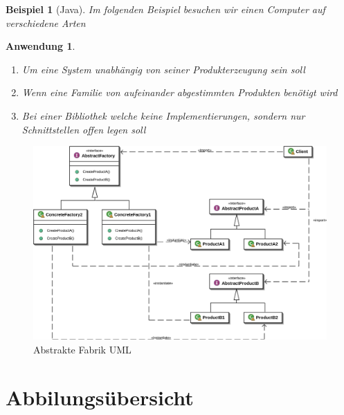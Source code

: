 \documentclass[a4paper]{article}
\theoremstyle{break}
\newtheorem{ex}{Beispiel}[section]
\newtheorem{why}{Anwendung}[section]
\begin{document}
\begin{ex}[Java]
	Im folgenden Beispiel besuchen wir einen Computer auf verschiedene Arten
	
	
	
	
	
	
	
	
	
	
	
	
\end{ex}

\begin{why}
	\begin{enumerate}
		\item Um eine System unabhängig von seiner Produkterzeugung sein soll
		\item Wenn eine Familie von aufeinander abgestimmten Produkten benötigt wird
		\item Bei einer Bibliothek welche keine Implementierungen, sondern nur Schnittstellen offen legen soll
	\end{enumerate}
	
	
\end{why}
\begin{figure}[H]
	\centering
	\includegraphics[width=\textwidth]{../diagrams/uml/AbstractFactoryPattern.png}
	\caption{Abstrakte Fabrik UML}
\end{figure}

\newpage
\appendix
\section{Abbilungsübersicht}
\listoffigures


	
\end{document}
